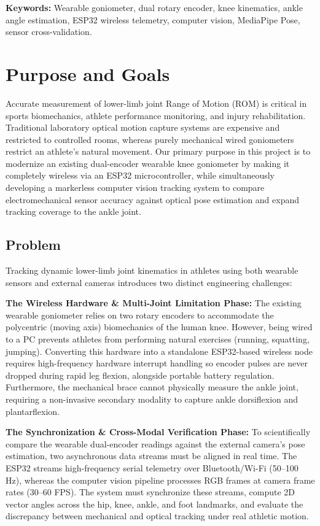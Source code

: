 \documentclass[11pt, a4paper]{article}
\begin{document}
\textbf{Keywords:} Wearable goniometer, dual rotary encoder, knee kinematics, ankle angle estimation, ESP32 wireless telemetry, computer vision, MediaPipe Pose, sensor cross-validation.

\section{Purpose and Goals}
Accurate measurement of lower-limb joint Range of Motion (ROM) is critical in sports biomechanics, athlete performance monitoring, and injury rehabilitation. Traditional laboratory optical motion capture systems are expensive and restricted to controlled rooms, whereas purely mechanical wired goniometers restrict an athlete's natural movement. Our primary purpose in this project is to modernize an existing dual-encoder wearable knee goniometer by making it completely wireless via an ESP32 microcontroller, while simultaneously developing a markerless computer vision tracking system to compare electromechanical sensor accuracy against optical pose estimation and expand tracking coverage to the ankle joint.

\subsection{Problem}
Tracking dynamic lower-limb joint kinematics in athletes using both wearable sensors and external cameras introduces two distinct engineering challenges:

\textbf{The Wireless Hardware \& Multi-Joint Limitation Phase:} The existing wearable goniometer relies on two rotary encoders to accommodate the polycentric (moving axis) biomechanics of the human knee. However, being wired to a PC prevents athletes from performing natural exercises (running, squatting, jumping). Converting this hardware into a standalone ESP32-based wireless node requires high-frequency hardware interrupt handling so encoder pulses are never dropped during rapid leg flexion, alongside portable battery regulation. Furthermore, the mechanical brace cannot physically measure the ankle joint, requiring a non-invasive secondary modality to capture ankle dorsiflexion and plantarflexion.

\textbf{The Synchronization \& Cross-Modal Verification Phase:} To scientifically compare the wearable dual-encoder readings against the external camera's pose estimation, two asynchronous data streams must be aligned in real time. The ESP32 streams high-frequency serial telemetry over Bluetooth/Wi-Fi (50--100 Hz), whereas the computer vision pipeline processes RGB frames at camera frame rates (30--60 FPS). The system must synchronize these streams, compute 2D vector angles across the hip, knee, ankle, and foot landmarks, and evaluate the discrepancy between mechanical and optical tracking under real athletic motion.
\end{document}
